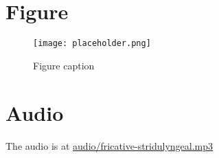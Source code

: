 
\section{Figure}

\begin{figure}[h]
  \centering\texttt{[image: placeholder.png]}
  \caption{Figure caption}
\end{figure}

\section{Audio}


The audio is at \href{run:audio/fricative-stridulyngeal.mp3}{audio/fricative-stridulyngeal.mp3}